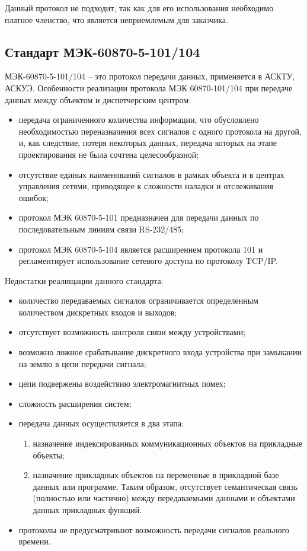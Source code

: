 Данный протокол не подходит, так как для его использования необходимо платное членство, что является неприемлемым для заказчика.

\subsection{Стандарт МЭК-60870-5-101/104}

МЭК-60870-5-101/104 – это протокол передачи данных, применяется в АСКТУ, АСКУЭ. Особенности реализации протокола МЭК 60870-101/104 при передаче данных между объектом и диспетчерским центром:

\begin{itemize}
 \item передача ограниченного количества информации, что обусловлено необходимостью переназначения всех сигналов с одного протокола на другой, и, как следствие, потеря некоторых данных, передача которых на этапе проектирования не была сочтена целесообразной;
 \item отсутствие единых наименований сигналов в рамках объекта и в центрах управления сетями, приводящее к сложности наладки и отслеживания ошибок;
 \item протокол МЭК 60870-5-101 предназначен для передачи данных по последовательным линиям связи RS-232/485;
 \item протокол МЭК 60870-5-104 является расширением протокола 101 и регламентирует использование сетевого доступа по протоколу TCP/IP.
\end{itemize}

Недостатки реалищации данного стандарта:

\begin{itemize}
 \item количество передаваемых сигналов ограничивается определенным количеством дискретных входов и выходов;
 \item отсутствует возможность контроля связи между устройствами;
 \item возможно ложное срабатывание дискретного входа устройства при замыкании на землю в цепи передачи сигнала;
 \item цепи подвержены воздействию электромагнитных помех;
 \item сложность расширения систем;
 \item передача данных осуществляется в два этапа:
 \begin{enumerate}
  \item назначение индексированных коммуникационных объектов на прикладные объекты;
  \item  назначение прикладных объектов на переменные в прикладной базе данных или программе. Таким образом, отсутствует семантическая связь (полностью или частично) между передаваемыми данными и объектами данных прикладных функций.
 \end{enumerate}
 \item протоколы не предусматривают возможность передачи сигналов реального времени.
\end{itemize}

